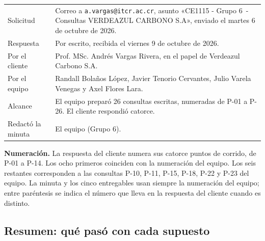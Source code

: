 \documentclass[11pt,letterpaper]{article}
\newcommand{\numgrupo}{6}
\newcommand{\fechasolicitud}{martes 6 de octubre de 2026}   %
\newcommand{\fecharespuesta}{viernes 9 de octubre de 2026}   %
\begin{document}
\begin{center}
\small
\renewcommand{\arraystretch}{1.3}
\begin{tabularx}{\textwidth}{@{}L{3.6cm} Y@{}}
\toprule
Solicitud & Correo a \texttt{a.vargas@itcr.ac.cr}, asunto «CE1115 - Grupo \numgrupo\ - Consultas VERDEAZUL CARBONO S.A», enviado el \fechasolicitud. \\
Respuesta & Por escrito, recibida el \fecharespuesta. \\
Por el cliente & Prof. MSc. Andrés Vargas Rivera, en el papel de Verdeazul Carbono S.A. \\
Por el equipo & Randall Bolaños López, Javier Tenorio Cervantes, Julio Varela Venegas y Axel Flores Lara. \\
Alcance & El equipo preparó 26 consultas escritas, numeradas de P-01 a P-26. El cliente respondió catorce. \\
Redactó la minuta & El equipo (Grupo \numgrupo). \\
\bottomrule
\end{tabularx}
\end{center}

\textbf{Numeración.} La respuesta del cliente numera sus catorce puntos de corrido, de P-01 a P-14. Los
ocho primeros coinciden con la numeración del equipo. Los seis restantes corresponden a las consultas
P-10, P-11, P-15, P-18, P-22 y P-23 del equipo. La minuta y los cinco entregables usan siempre la
numeración del equipo; entre paréntesis se indica el número que lleva en la respuesta del cliente
cuando es distinto.

\subsection*{Resumen: qué pasó con cada supuesto}
\end{document}
